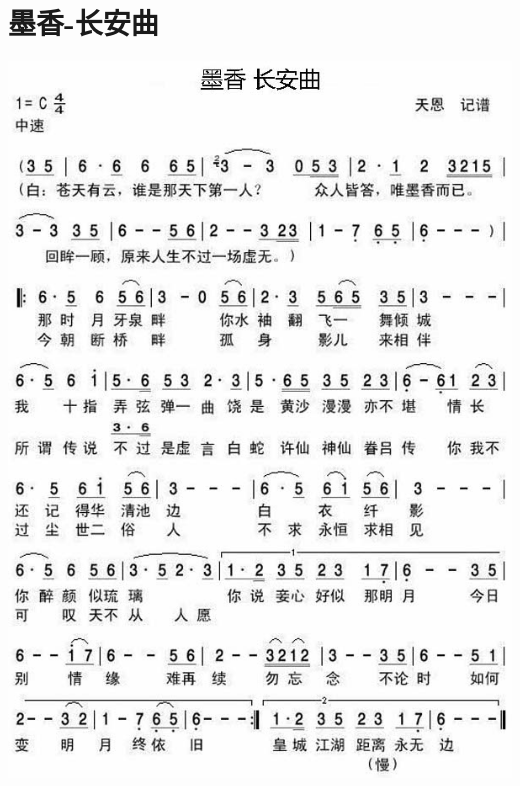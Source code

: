 \documentclass[cn,pad,chinese,chinesefont=nofont]{elegantbook}
\begin{document}
\section{墨香-长安曲}
    \includegraphics[width=\textwidth]{dongxiao/20200323墨香-长安曲.jpg} 
\end{document}
